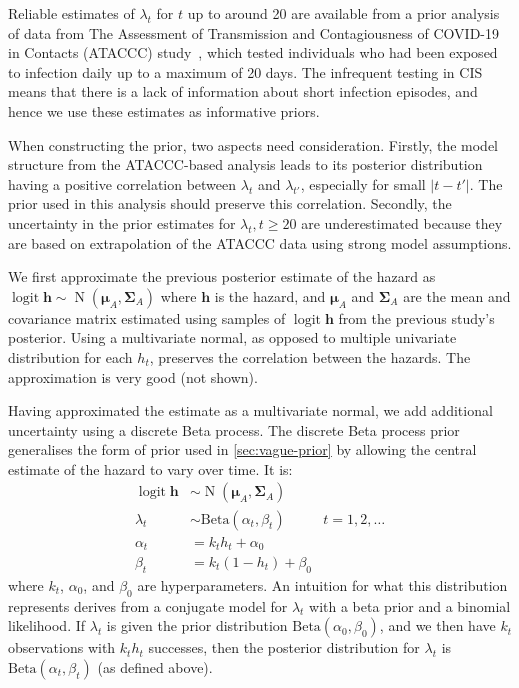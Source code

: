 \documentclass[12pt]{article}
\def\dist{\sim}
\DeclareMathOperator{\logit}{logit}
\DeclareMathOperator{\MNorm}{N}
\newcommand\matr{\bm}
\renewcommand{\vec}[1]{\bm{#1}}
\begin{document}
Reliable estimates of $\lambda_t$ for $t$ up to around 20 are available from a prior analysis of data from The Assessment of Transmission and Contagiousness of COVID-19 in Contacts (ATACCC) study~\citep{hakkiOnset}, which tested individuals who had been exposed to infection daily up to a maximum of 20 days.
The infrequent testing in CIS means that there is a lack of information about short infection episodes, and hence we use these estimates as informative priors.

When constructing the prior, two aspects need consideration.
Firstly, the model structure from the ATACCC-based analysis leads to its posterior distribution having a positive correlation between $\lambda_t$ and $\lambda_{t'}$, especially for small $|t-t'|$.
The prior used in this analysis should preserve this correlation.
Secondly, the uncertainty in the prior estimates for $\lambda_t, t\geq20$ are underestimated because they are based on extrapolation of the ATACCC data using strong model assumptions.

We first approximate the previous posterior estimate of the hazard as $\logit{\vec{h}} \dist \MNorm(\vec{\mu}_A, \matr{\Sigma}_A)$ where $\vec{h}$ is the hazard, and $\vec{\mu}_A$ and $\matr{\Sigma}_A$ are the mean and covariance matrix estimated using samples of $\logit{\vec{h}}$ from the previous study's posterior.
Using a multivariate normal, as opposed to multiple univariate distribution for each $h_t$, preserves the correlation between the hazards.
The approximation is very good (not shown).

Having approximated the estimate as a multivariate normal, we add additional uncertainty using a discrete Beta process.
The discrete Beta process prior~\citep{ibrahimBayesian,sunStatisticala} generalises the form of prior used in \cref{sec:vague-prior} by allowing the central estimate of the hazard to vary over time.
It is:
\begin{align}
  \logit \vec{h} &\dist \MNorm(\vec{\mu}_A, \matr{\Sigma}_A) \\
  \lambda_t &\dist \text{Beta}(\alpha_t, \beta_t) &t = 1, 2, \dots \\
  \alpha_t &= k_t h_t + \alpha_0 \\
  \beta_t &= k_t (1 - h_t) + \beta_0
\end{align}
where $k_t$, $\alpha_0$, and $\beta_0$ are hyperparameters.
An intuition for what this distribution represents derives from a conjugate model for $\lambda_t$ with a beta prior and a binomial likelihood.
If $\lambda_t$ is given the prior distribution $\text{Beta}(\alpha_0, \beta_0)$, and we then have $k_t$ observations with $k_t h_t$ successes, then the posterior distribution for $\lambda_t$ is $\text{Beta}(\alpha_t, \beta_t)$ (as defined above).
\end{document}
